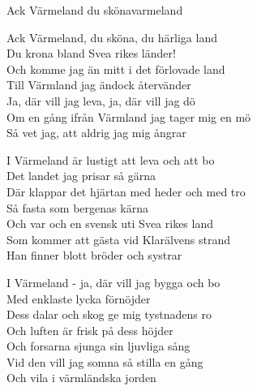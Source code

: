 \begin{song}{Ack Värmeland du sköna}{varmeland}
\begin{vers}
Ack Värmeland, du sköna, du härliga land\\
Du krona bland Svea rikes länder!\\
Och komme jag än mitt i det förlovade land\\
Till Värmland jag ändock återvänder\\
Ja, där vill jag leva, ja, där vill jag dö\\
Om en gång ifrån Värmland jag tager mig en mö\\
Så vet jag, att aldrig jag mig ångrar\\
\end{vers}
\begin{vers}
I Värmeland är lustigt att leva och att bo\\
Det landet jag prisar så gärna\\
Där klappar det hjärtan med heder och med tro\\
Så fasta som bergenas kärna\\
Och var och en svensk uti Svea rikes land\\
Som kommer att gästa vid Klarälvens strand\\
Han finner blott bröder och systrar\\
\end{vers}
\begin{vers}
I Värmeland - ja, där vill jag bygga och bo\\
Med enklaste lycka förnöjder\\
Dess dalar och skog ge mig tystnadens ro\\
Och luften är frisk på dess höjder\\
Och forsarna sjunga sin ljuvliga sång\\
Vid den vill jag somna så stilla en gång\\
Och vila i värmländska jorden\\
\end{vers}
\end{song}
